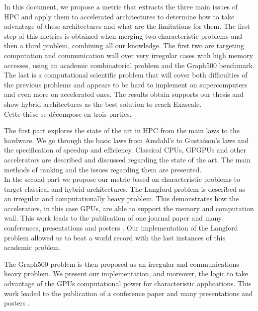 \documentclass[12pt,a4paper]{report}
\begin{document}
In this document, we propose a metric that extracts the three main issues of HPC and apply them to accelerated architectures to determine how to take advantage of these architectures and what are the limitations for them. 
The first step of this metrics is obtained when merging two characteristic problems and then a third problem, combining all our knowledge.
The first two are targeting computation and communication wall over very irregular cases with high memory accesses, using an academic combinatorial problem and the Graph500 benchmark. 
The last is a computational scientific problem that will cover both difficulties of the previous problems and appears to be hard to implement on supercomputers and even more on accelerated ones.
The results obtain supports our thesis and show hybrid architectures as the best solution to reach Exascale.\\

Cette thèse se décompose en trois parties.

The first part explores the state of the art in HPC from the main laws to the hardware. 	
We go through the basic laws from Amdahl's to Gustafson's laws and the specification of speedup and efficiency.
Classical CPUs, GPGPUs and other accelerators are described and discussed regarding the state of the art. 
The main methods of ranking and the issues regarding them are presented.\\ 

In the second part we propose our metric based on characteristic problems to target classical and hybrid architectures.
The Langford problem is described as an irregular and computationally heavy problem.
This demonstrates how the accelerators, in this case GPUs, are able to support the memory and computation wall. 
This work leads to the publication of one journal paper \cite{krajecki2016many} and many conferences, presentations and posters \cite{deleau2014towards,j2016resolution,jaillet2014Langford}.
Our implementation of the Langford problem allowed us to beat a world record with the last instances of this academic problem.

The Graph500 problem is then proposed as an irregular and communications heavy problem. 
We present our implementation, and moreover, the logic to take advantage of the GPUs computational power for characteristic applications. 
This work leaded to the publication of a conference paper \cite{krajecki2016bfs} and many presentations and posters \cite{loiseau2015parcours,loiseau2015GTC}.\\
\end{document}
